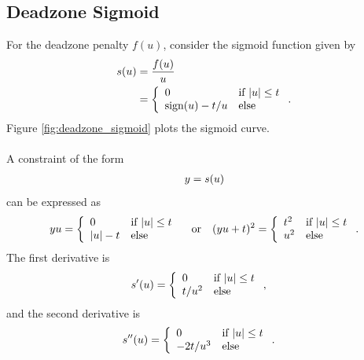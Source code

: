 \documentclass{article}
\begin{document}
    \clearpage

    \subsection{Deadzone Sigmoid}
        For the deadzone penalty $f(u)$, consider the sigmoid function given by
        \begin{align*}
            s(u)&=\frac{f(u)}{u}\\
            &=
            \left\{\begin{array}{lllllllllllllllllll}0 & \text{if $|u|\leq t$} \\ \text{sign}(u)-t/u & \text{else}\end{array}\right..
        \end{align*}
        Figure \ref{fig:deadzone_sigmoid} plots the sigmoid curve. 
        \\
        \\
        A constraint of the form
        \begin{align*}
            y=s(u)
        \end{align*}
        can be expressed as
        \begin{align*}
            yu=
            \left\{\begin{array}{lllllllllllllllllll}0 & \text{if $|u|\leq t$} \\ |u|-t & \text{else}\end{array}\right.\quad\text{or}\quad
            (yu+t)^2=
            \left\{\begin{array}{lllllllllllllllllll}t^2 & \text{if $|u|\leq t$} \\ u^2 & \text{else}\end{array}\right.
            .
        \end{align*}
        The first derivative is
        \begin{align*}
            s'(u)
            &=
            \left\{\begin{array}{lllllllllllllllllll}0 & \text{if $|u|\leq t$} \\ t/u^2 & \text{else}\end{array}\right.,
        \end{align*}
        and the second derivative is
        \begin{align*}
            s''(u)
            &=
            \left\{\begin{array}{lllllllllllllllllll}0 & \text{if $|u|\leq t$} \\ -2t/u^3 & \text{else}\end{array}\right..
        \end{align*}
\end{document}
